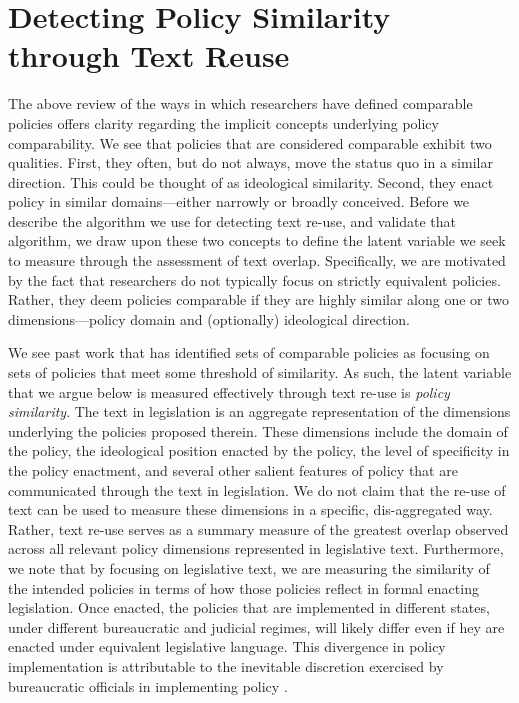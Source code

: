 \documentclass[12pt]{article} %
\begin{document}
\section{Detecting Policy Similarity through Text Reuse}

The above review of the ways in which researchers have defined comparable policies offers clarity regarding the implicit concepts underlying policy comparability. We see that policies that are considered comparable exhibit two qualities. First, they often, but do not always, move the status quo in a similar direction. This could be thought of as ideological similarity. Second, they enact policy in similar domains---either narrowly or broadly conceived. Before we describe the algorithm we use for detecting text re-use, and validate that algorithm, we draw upon these two concepts to define the latent variable we seek to measure through the assessment of text overlap. Specifically, we are motivated by the fact that researchers do not typically focus on strictly equivalent policies. Rather, they deem policies comparable if they are highly similar along one or two dimensions---policy domain and (optionally) ideological direction. 

We see past work that has identified sets of comparable policies as focusing on sets of policies that meet some threshold of similarity. As such, the latent variable that we argue below is measured effectively through text re-use is {\em policy similarity}. The text in legislation is an aggregate representation of the dimensions underlying the policies proposed therein. These dimensions include the domain of the policy, the ideological position enacted by the policy, the level of specificity in the policy enactment, and several other salient features of policy that are communicated through the text in legislation. We do not claim that the re-use of text can be used to measure these dimensions in a specific, dis-aggregated way. Rather, text re-use serves as a summary measure of the greatest overlap observed across all relevant policy dimensions represented in legislative text. Furthermore, we note that by focusing on legislative text, we are measuring the similarity of the intended policies in terms of how those policies reflect in formal enacting legislation. Once enacted, the policies that are implemented in different states, under different bureaucratic and judicial regimes, will likely differ even if hey are enacted under equivalent legislative language. This divergence in policy implementation is attributable to the inevitable discretion exercised by bureaucratic officials in implementing policy \citep{weingast1983bureaucratic,scott1997assessing,gerber2005state}. 
\end{document}
